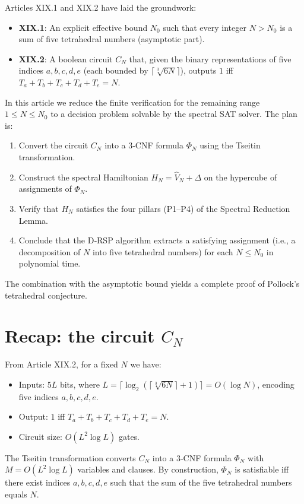 \documentclass[11pt,a4paper]{article}
\begin{document}
Articles XIX.1 and XIX.2 have laid the groundwork:
\begin{itemize}
\item \textbf{XIX.1}: An explicit effective bound \(N_0\) such that every integer \(N > N_0\) is a sum of five tetrahedral numbers (asymptotic part).
\item \textbf{XIX.2}: A boolean circuit \(C_N\) that, given the binary representations of five indices \(a,b,c,d,e\) (each bounded by \(\lceil \sqrt[3]{6N}\rceil\)), outputs \(1\) iff \(T_a+T_b+T_c+T_d+T_e=N\).
\end{itemize}
In this article we reduce the finite verification for the remaining range \(1\le N\le N_0\) to a decision problem solvable by the spectral SAT solver. The plan is:
\begin{enumerate}
\item Convert the circuit \(C_N\) into a 3‑CNF formula \(\Phi_N\) using the Tseitin transformation.
\item Construct the spectral Hamiltonian \(H_N = \hat{V}_N + \Delta\) on the hypercube of assignments of \(\Phi_N\).
\item Verify that \(H_N\) satisfies the four pillars (P1–P4) of the Spectral Reduction Lemma.
\item Conclude that the D‑RSP algorithm extracts a satisfying assignment (i.e., a decomposition of \(N\) into five tetrahedral numbers) for each \(N\le N_0\) in polynomial time.
\end{enumerate}
The combination with the asymptotic bound yields a complete proof of Pollock's tetrahedral conjecture.

\section{Recap: the circuit \(C_N\)}

From Article XIX.2, for a fixed \(N\) we have:
\begin{itemize}
\item Inputs: \(5L\) bits, where \(L = \lceil \log_2(\lceil \sqrt[3]{6N}\rceil+1)\rceil = O(\log N)\), encoding five indices \(a,b,c,d,e\).
\item Output: \(1\) iff \(T_a+T_b+T_c+T_d+T_e = N\).
\item Circuit size: \(O(L^2 \log L)\) gates.
\end{itemize}

The Tseitin transformation converts \(C_N\) into a 3‑CNF formula \(\Phi_N\) with \(M = O(L^2 \log L)\) variables and clauses. By construction, \(\Phi_N\) is satisfiable iff there exist indices \(a,b,c,d,e\) such that the sum of the five tetrahedral numbers equals \(N\).
\end{document}
